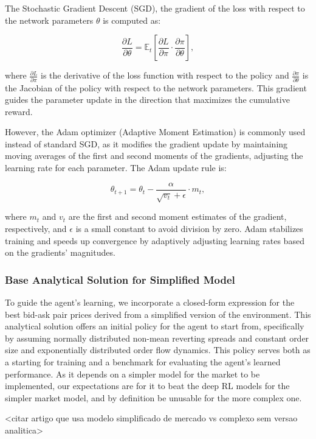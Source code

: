 The Stochastic Gradient Descent (SGD), the gradient of the loss with respect to the network parameters \( \theta \) is computed as:

\[
    \frac{\partial L}{\partial \theta} = \mathbb{E}_t \left[ \frac{\partial L}{\partial \pi} \cdot \frac{\partial \pi}{\partial \theta} \right],
\]

where \(\frac{\partial L}{\partial \pi}\) is the derivative of the loss function with respect to the policy
and \(\frac{\partial \pi}{\partial \theta}\) is the Jacobian of the policy with respect to the network parameters.
This gradient guides the parameter update in the direction that maximizes the cumulative reward.

However, the Adam optimizer (Adaptive Moment Estimation) is commonly used instead of standard SGD,
as it modifies the gradient update by maintaining moving averages of the first and second moments of the gradients, adjusting the learning rate for each parameter.
The Adam update rule is:

\[
    \theta_{t+1} = \theta_t - \frac{\alpha}{\sqrt{v_t} + \epsilon} \cdot m_t,
\]

where $m_t$ and $v_t$ are the first and second moment estimates of the gradient, respectively, and $\epsilon$ is a small constant to avoid division by zero.
Adam stabilizes training and speeds up convergence by adaptively adjusting learning rates based on the gradients' magnitudes.

\subsubsection{Base Analytical Solution for Simplified Model}

To guide the agent's learning, we incorporate a closed-form expression for the best bid-ask pair prices derived from a simplified version of the environment.
This analytical solution offers an initial policy for the agent to start from,
specifically by assuming normally distributed non-mean reverting spreads and constant order size and exponentially distributed order flow dynamics.
This policy serves both as a starting for training and a benchmark for evaluating the agent's learned performance.
As it depends on a simpler model for the market to be implemented, our expectations are for it to beat the deep RL models for the simpler market model,
and by definition be unusable for the more complex one.

<citar artigo que usa modelo simplificado de mercado vs complexo sem versao analitica>
